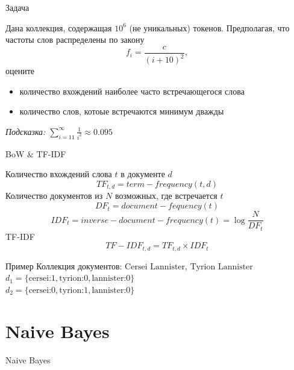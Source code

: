 \documentclass[10pt]{beamer}
\begin{document}

\begin{frame}{Задача}

Дана коллекция, содержащая $10^6$ (не уникальных) токенов. Предполагая, что частоты слов распределены по закону
\[
f_i = \frac{c}{(i + 10)^2},
\]
оцените
\begin{itemize}
\item количество вхождений наиболее часто встречающегося слова
\item количество слов, котоые встречаются минимум дважды
\end{itemize}

\vspace{1em}
{\it Подсказка: $\sum_{i=11}^{\infty}\frac{1}{i^2} \approx 0.095$}

\end{frame}


\begin{frame}{BoW \& TF-IDF}

\vspace{1em}
Количество вхождений слова $t$ в документе $d$
\[
TF_{t,d} = term\!\!-\!\!frequency(t, d)
\]
Количество документов из $N$ возможных, где встречается $t$
\[
DF_t = document\!\!-\!\!fequency(t)
\]
\[
IDF_t = inverse\!\!-\!\!document\!\!-\!\!frequency(t) = \log \frac{N}{DF_t}
\]
TF-IDF
\[
TF\!\!-\!\!IDF_{t,d} = TF_{t,d} \times IDF_t
\]
\begin{exampleblock}{Пример}
Коллекция документов: $\text{Cersei Lannister}$, $\text{Tyrion Lannister}$ \\
$d_1 = \{\text{cersei:}1,\text{tyrion:}0,\text{lannister:}0\}$ \\
$d_2 = \{\text{cersei:}0,\text{tyrion:}1,\text{lannister:}0\}$
\end{exampleblock}

\end{frame}


\section{Naive Bayes}


\begin{frame}{}

\begin{center}
\Large Naive Bayes
\end{center}

\end{frame}
\end{document}

